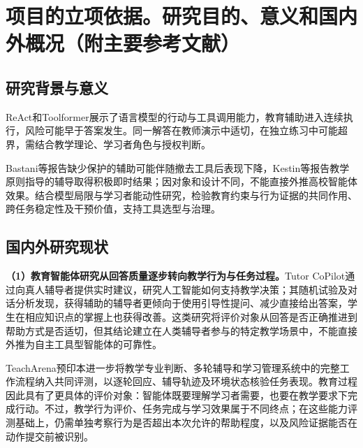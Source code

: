 \setlength{\intextsep}{2bp}

\section{项目的立项依据。研究目的、意义和国内外概况（附主要参考文献）}
\subsection{研究背景与意义}
ReAct和Toolformer展示了语言模型的行动与工具调用能力\cite{yao2023react,schick2023toolformer}，教育辅助进入连续执行，风险可能早于答案发生。同一解答在教师演示中适切，在独立练习中可能超界，需结合教学理论、学习者角色与授权判断\cite{zawacki2019review,ouyang2021paradigms}。

Bastani等报告缺少保护的辅助可能伴随撤去工具后表现下降，Kestin等报告教学原则指导的辅导取得积极即时结果\cite{bastani2025learning,kestin2025tutoring}；因对象和设计不同，不能直接外推高校智能体效果。结合模型局限与学习者能动性研究\cite{yan2024learning}，检验教育约束与行为证据的共同作用、跨任务稳定性及干预价值，支持工具选型与治理。


\subsection{国内外研究现状}
\textbf{（1）教育智能体研究从回答质量逐步转向教学行为与任务过程。}Tutor CoPilot通过向真人辅导者提供实时建议，研究人工智能如何支持教学决策；其随机试验及对话分析发现，获得辅助的辅导者更倾向于使用引导性提问、减少直接给出答案，学生在相应知识点的掌握上也获得改善\cite{wang2024tutorcopilot}。这类研究将评价对象从回答是否正确推进到帮助方式是否适切，但其结论建立在人类辅导者参与的特定教学场景中，不能直接外推为自主工具型智能体的可靠性。

TeachArena预印本进一步将教学专业判断、多轮辅导和学习管理系统中的完整工作流程纳入共同评测，以逐轮回应、辅导轨迹及环境状态核验任务表现\cite{teacharena2026}。教育过程因此具有了更具体的评价对象：智能体既要理解学习者需要，也要在教学要求下完成行动。不过，教学行为评价、任务完成与学习效果属于不同终点；在这些能力评测基础上，仍需单独考察行为是否超出本次允许的帮助程度，以及风险证据能否在动作提交前被识别。

